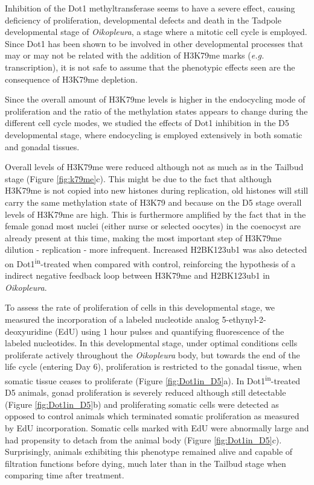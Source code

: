 \documentclass[11pt,twoside,a4paper]{report}
\begin{document}
	Inhibition of the Dot1 methyltransferase seems to have a severe effect, causing deficiency of proliferation, developmental defects and death in the Tadpole developmental stage of \textit{Oikopleura}, a stage where a mitotic cell cycle is employed. Since Dot1 has been shown to be involved in other developmental processes that may or may not be related with the addition of H3K79me marks (\textit{e.g.} transcription), it is not safe to assume that the phenotypic effects seen are the consequence of H3K79me depletion.
	
	Since the overall amount of H3K79me levels is higher in the endocycling mode of proliferation and the ratio of the methylation states appears to change during the different cell cycle modes, we studied the effects of Dot1 inhibition in the D5 developmental stage, where endocycling is employed extensively in both somatic and gonadal tissues.
	
	Overall levels of H3K79me were reduced although not as much as in the Tailbud stage (Figure \ref{fig:k79me}c). This might be due to the fact that although H3K79me is not copied into new histones during replication, old histones will still carry the same methylation state of H3K79 and because on the D5 stage overall levels of H3K79me are high. This is furthermore amplified by the fact that in the female gonad most nuclei (either nurse or selected oocytes) in the coenocyst are already present at this time, making the most important step of H3K79me dilution - replication - more infrequent. Increased H2BK123ub1 was also detected on Dot1\textsuperscript{in}-treated when compared with control, reinforcing the hypothesis of a indirect negative feedback loop between H3K79me and H2BK123ub1 in \textit{Oikopleura}.
	
	To assess the rate of proliferation of cells in this developmental stage, we measured the incorporation of a labeled nucleotide analog 5-ethynyl-2-deoxyuridine (EdU) using 1 hour pulses and quantifying fluorescence of the labeled nucleotides. In this developmental stage, under optimal conditions cells proliferate actively throughout the \textit{Oikopleura} body, but towards the end of the life cycle (entering Day 6), proliferation is restricted to the gonadal tissue, when somatic tissue ceases to proliferate (Figure \ref{fig:Dot1in_D5}a). In Dot1\textsuperscript{in}-treated D5 animals, gonad proliferation is severely reduced although still detectable (Figure \ref{fig:Dot1in_D5}b) and proliferating somatic cells were detected as opposed to control animals which terminated somatic proliferation as measured by EdU incorporation. Somatic cells marked with EdU were abnormally large and had propensity to detach from the animal body (Figure \ref{fig:Dot1in_D5}c). Surprisingly, animals exhibiting this phenotype remained alive and capable of filtration functions before dying, much later than in the Tailbud stage when comparing time after treatment.
	
\end{document}
